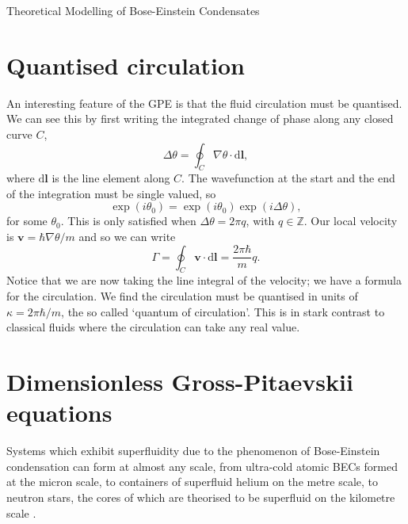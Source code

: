 \begin{chapter}{\label{cha:theoretical_model}Theoretical Modelling of Bose-Einstein Condensates}
\section{\label{section:quantisedcirculation} Quantised circulation}
An interesting feature of the GPE is that the fluid circulation must be quantised. We can see this by first writing the integrated change of phase along any closed curve $C$,
\begin{equation}
	\Delta\theta = \oint_C \! \nabla \theta  \cdot \mathrm{d}\mathbf{l},
\end{equation}
where $\mathrm{d}\mathbf{l}$ is the line element along $C$. The wavefunction at the start and the end of the integration must be single valued, so
\begin{equation}
	\exp (i\theta_0) = \exp (i\theta_0)\exp (i\Delta\theta),
\end{equation}
for some $\theta_0$. This is only satisfied when $\Delta\theta = 2\pi q$, with $q\in\mathbb{Z}$. Our local velocity is $\mathbf{v} = \hbar\nabla\theta/m $ and so we can write
\begin{equation}
	\Gamma = \oint_C \! \mathbf{v} \cdot \mathrm{d}\mathbf{l} = \frac{2 \pi \hbar}{m}q.
\end{equation}
Notice that we are now taking the line integral of the velocity; we have a formula for the circulation. We find the circulation must be quantised in units of $\kappa = 2 \pi \hbar/m$, the so called `quantum of circulation'. This is in stark contrast to classical fluids where the circulation can take any real value.

\section{\label{section:gpedimless} Dimensionless Gross-Pitaevskii equations}
	Systems which exhibit superfluidity due to the phenomenon of Bose-Einstein condensation can form at almost any scale, from ultra-cold atomic BECs formed at the micron scale, %
	to containers of superfluid helium on the metre scale, to neutron stars, the cores of which are theorised to be superfluid on the kilometre scale \cite{Warszawski01082011}.


\end{chapter}

